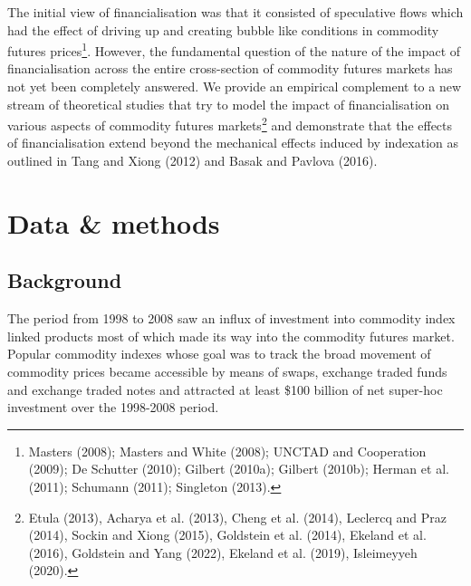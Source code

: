 \documentclass[]{elsarticle} %
\begin{document}
The initial view of financialisation was that it consisted of speculative flows which had the effect of driving up and creating bubble like conditions in commodity futures prices\footnote{Masters (2008); Masters and White (2008); UNCTAD and Cooperation (2009); De Schutter (2010); Gilbert (2010a); Gilbert (2010b); Herman et al. (2011); Schumann (2011); Singleton (2013).}. However, the fundamental question of the nature of the impact of financialisation across the entire cross-section of commodity futures markets has not yet been completely answered. We provide an empirical complement to a new stream of theoretical studies that try to model the impact of financialisation on various aspects of commodity futures markets\footnote{Etula (2013), Acharya et al. (2013), Cheng et al. (2014), Leclercq and Praz (2014), Sockin and Xiong (2015), Goldstein et al. (2014), Ekeland et al. (2016), Goldstein and Yang (2022), Ekeland et al. (2019), Isleimeyyeh (2020).} and demonstrate that the effects of financialisation extend beyond the mechanical effects induced by indexation as outlined in Tang and Xiong (2012) and Basak and Pavlova (2016).

\newpage

\hypertarget{co-movement-data-methods}{%
\section{Data \& methods}\label{co-movement-data-methods}}

\hypertarget{co-movement-background}{%
\subsection{Background}\label{co-movement-background}}

The period from 1998 to 2008 saw an influx of investment into commodity index linked products most of which made its way into the commodity futures market. Popular commodity indexes whose goal was to track the broad movement of commodity prices became accessible by means of swaps, exchange traded funds and exchange traded notes and attracted at least \$100 billion of net super-hoc investment over the 1998-2008 period.

\medskip\setlength{\parindent}{0pt}
\end{document}
